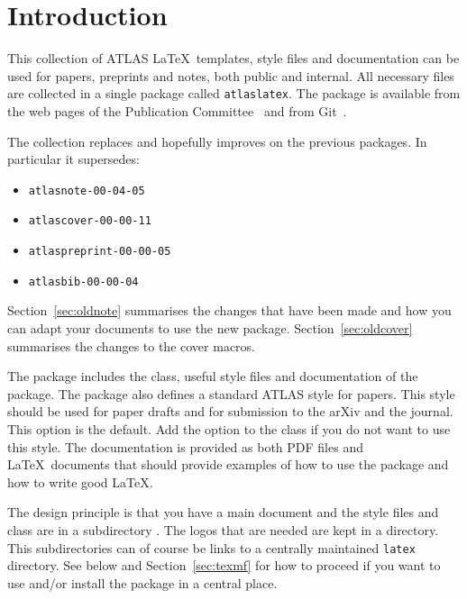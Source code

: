
\section{Introduction}
\label{sec:intro}

This collection of ATLAS \LaTeX\ templates, style files and documentation
can be used for papers, preprints and notes, both public and internal. 
All necessary files are collected in a single package called \texttt{atlaslatex}.
The package is available from the web pages of the Publication Committee~\cite{pubcom} and from 
Git~\cite{pubcom-git}.

The collection replaces and hopefully improves on the previous packages. 
In particular it supersedes:
\begin{itemize}\setlength{\parskip}{0pt}\setlength{\itemsep}{0pt}
\item \texttt{atlasnote-00-04-05}
\item \texttt{atlascover-00-00-11}
\item \texttt{atlaspreprint-00-00-05}
\item \texttt{atlasbib-00-00-04}
\end{itemize}
Section~\ref{sec:oldnote} summarises the changes that have been made and
how you can adapt your documents to use the new package.
Section~\ref{sec:oldcover} summarises the changes to the cover macros.

The package includes the  class, useful style files
and documentation of the package.
The package also defines a standard ATLAS style for papers.
This style should be used for paper drafts and for submission to the arXiv and the journal.
This option is the default. Add the option  to the  class if you do not want to use this style.
The documentation is provided as both PDF files and \LaTeX\ documents
that should provide examples of how to use the package and how to write
good \LaTeX.

The design principle is that you have a main document and 
the style files and  class are in a subdirectory .
The logos that are needed are kept in a  directory.
This subdirectories can of course be links to a centrally maintained \texttt{latex} directory.
See below and Section~\ref{sec:texmf} for how to proceed if you want to use and/or install
the package in a central place.

